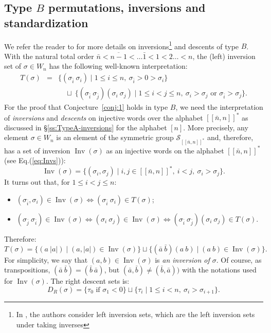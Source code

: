 \documentclass[ALCO,Unicode]{cedram}
\theoremstyle{definition}
\DeclareMathOperator{\invs}{Inv}
\newcommand{\Bsetnn}{[\![\bar{n},n ]\!]^*}
\begin{document}
\subsection{Type \texorpdfstring{$B$}{B} permutations, inversions and standardization} We refer the reader to \cite[\S8.1]{BjBr05} for more details on inversions\footnote{In \cite{BjBr05}, the authors consider left inversion sets, which are the left inversion sets under taking inverses} and descents of type $B$. With the natural total order $\bar n<\overline{n-1}<\dots \bar 1<1<2\dots <n$, the (left) inversion set of $\sigma\in W_n$ has the following well-known interpretation:
\begin{eqnarray*}
T(\sigma)&=&\{(\sigma_{\bar i} \ \sigma_i )\mid 1\leq i\leq n,\ \sigma_{\bar i} > 0>\sigma_i \}\\
&&\quad \sqcup\ \{  (\sigma_{\bar i}\ \sigma_{\bar j})(\sigma_i\ \sigma_j) \mid 1\leq i< j\leq n,  \  \sigma_i>\sigma_j\textrm{ or }\sigma_{\bar i}>\sigma_j \}.
\end{eqnarray*}
For the proof that Conjecture~\ref{conj:1} holds in type $B$, we need the interpretation of {\em inversions} and {\em descents} on injective words over the alphabet $\Bsetnn$ as discussed in \S\ref{ss:TypeA-inversions} for the alphabet $[n]$. More precisely, any element $\sigma\in W_n$ is an element of  the symmetric group $\mathcal S_{\Bsetnn}$ and, therefore, has a set of inversion $\invs(\sigma)$  as an injective words  on the alphabet $\Bsetnn$ (see Eq.(\ref{eq:Invs})):
$$
\invs(\sigma)=\{(\sigma_i, \sigma_j)\mid  i,j\in \Bsetnn,\  i<j,\ \sigma_i > \sigma_j \}.
$$
It turns out that, for $1\leq i< j\leq n$:
\begin{itemize}
\item $(\sigma_{\bar i}, \sigma_i )\in \invs(\sigma)\iff(\sigma_{\bar i} \ \sigma_i )\in T(\sigma)$;
\item $(\sigma_{\bar j}\ \sigma_{\bar i})\in \invs(\sigma)\iff (\sigma_i\ \sigma_j)\in\invs(\sigma)\iff  (\sigma_{\bar i}\ \sigma_{\bar j})(\sigma_i\ \sigma_j)\in T(\sigma)$. 
\end{itemize}
Therefore:
\begin{equation}\label{eq:InvTypeB}
T(\sigma)=\{(a\ |a|) \mid  (a,|a|)\in \invs(\sigma)\}\sqcup\{(\bar a\ \bar b)(a\ b)\mid (a\ b)\in \invs(\sigma)\}.
\end{equation}
For simplicity, we say that $(a,b)\in\invs(\sigma)$ is {\em an inversion of $\sigma$}. Of course, as transpositions, $(\bar a\ \bar b)=(\bar b \ \bar a)$, but $(\bar a, \bar b)\not =(\bar b,\bar a))$ with the notations used for $\invs(\sigma)$. The right descent sets is:
$$
D_R(\sigma)= \{\tau_0 \textrm{ if } \sigma_1<0\} \sqcup \{\tau_i \mid 1\leq i < n,\ \sigma_i >\sigma_{i+1}\}.
$$ 
\end{document}
